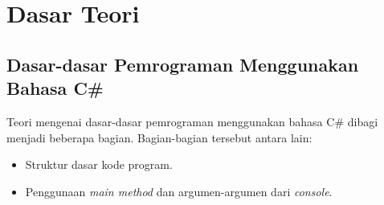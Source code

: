 \chapter{Dasar Teori}
\label{chap:dasar_teori}

\section{Dasar-dasar Pemrograman Menggunakan Bahasa C\#}
\label{sec:dasar_csharp}


Teori mengenai dasar-dasar pemrograman menggunakan bahasa C\# dibagi menjadi beberapa bagian. Bagian-bagian tersebut antara lain:

\begin{itemize}
    \item{Struktur dasar kode program.}
    \item{Penggunaan \textit{main method} dan argumen-argumen dari \textit{console}.}
    
\end{itemize}